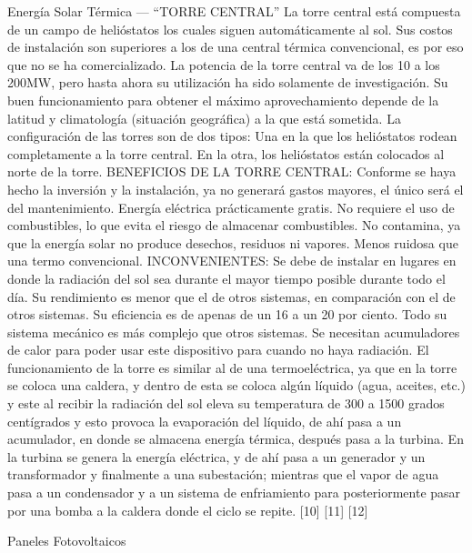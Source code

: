 \documentclass[12pt]{article}
\begin{document}
Energía Solar Térmica — “TORRE CENTRAL”
La torre central está compuesta de un campo de helióstatos los cuales siguen automáticamente al sol.
Sus costos de instalación son superiores a los de una central térmica convencional, es por eso que no se ha comercializado.
La potencia de la torre central va de los 10 a los 200MW, pero hasta ahora su utilización ha sido solamente de investigación.
Su buen funcionamiento para obtener el máximo aprovechamiento depende de la latitud y climatología (situación geográfica) a la que está sometida.
La configuración de las torres son de dos tipos:
Una en la que los helióstatos rodean completamente a la torre central.
En la otra, los helióstatos están colocados al norte de la torre.
BENEFICIOS DE LA TORRE CENTRAL:
Conforme se haya hecho la inversión y la instalación, ya no generará gastos mayores, el único será el del mantenimiento.
Energía eléctrica prácticamente gratis.
No requiere el uso de combustibles, lo que evita el riesgo de almacenar combustibles.
No contamina, ya que la energía solar no produce desechos, residuos ni vapores.
Menos ruidosa que una termo convencional.
INCONVENIENTES:
Se debe de instalar en lugares en donde la radiación del sol sea durante el mayor tiempo posible durante todo el día.
Su rendimiento es menor que el de otros sistemas, en comparación con el de otros sistemas. Su eficiencia es de apenas de un 16 a un 20 por ciento.
Todo su sistema mecánico es más complejo que otros sistemas.
Se necesitan acumuladores de calor para poder usar este dispositivo para cuando no haya radiación.
El funcionamiento de la torre es similar al de una termoeléctrica, ya que en la torre se coloca una caldera, y dentro de esta se coloca algún líquido (agua, aceites, etc.) y este al recibir la radiación del sol eleva su temperatura de 300 a 1500 grados centígrados y esto provoca la evaporación del líquido, de ahí pasa a un acumulador, en donde se almacena energía térmica, después pasa a la turbina.
En la turbina se genera la energía eléctrica, y de ahí pasa a un generador y un transformador y finalmente a una subestación; mientras que el vapor de agua pasa a un condensador y a un sistema de enfriamiento para posteriormente pasar por una bomba a la caldera donde el ciclo se repite. [10] [11] [12]


 
Paneles Fotovoltaicos
\end{document}
